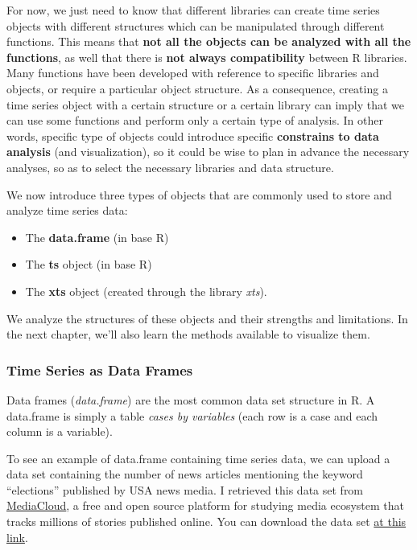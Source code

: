 \documentclass[
]{article}
\providecommand{\tightlist}{%
  \setlength{\itemsep}{0pt}\setlength{\parskip}{0pt}}
\begin{document}
For now, we just need to know that different libraries can create time series objects with different structures which can be manipulated through different functions. This means that \textbf{not all the objects can be analyzed with all the functions}, as well that there is \textbf{not always compatibility} between R libraries.
Many functions have been developed with reference to specific libraries and objects, or require a particular object structure. As a consequence, creating a time series object with a certain structure or a certain library can imply that we can use some functions and perform only a certain type of analysis. In other words, specific type of objects could introduce specific \textbf{constrains to data analysis} (and visualization), so it could be wise to plan in advance the necessary analyses, so as to select the necessary libraries and data structure.

We now introduce three types of objects that are commonly used to store and analyze time series data:

\begin{itemize}
\tightlist
\item
  The \textbf{data.frame} (in base R)
\item
  The \textbf{ts} object (in base R)
\item
  The \textbf{xts} object (created through the library \emph{xts}).
\end{itemize}

We analyze the structures of these objects and their strengths and limitations. In the next chapter, we'll also learn the methods available to visualize them.

\hypertarget{time-series-as-data-frames}{%
\subsubsection{Time Series as Data Frames}\label{time-series-as-data-frames}}

Data frames (\emph{data.frame}) are the most common data set structure in R. A data.frame is simply a table \emph{cases by variables} (each row is a case and each column is a variable).

To see an example of data.frame containing time series data, we can upload a data set containing the number of news articles mentioning the keyword ``elections'' published by USA news media. I retrieved this data set from \href{https://mediacloud.org}{MediaCloud}, a free and open source platform for studying media ecosystem that tracks millions of stories published online. You can download the data set \href{https://drive.google.com/file/d/1vzpdPFb_ihBlqqbHxJS7mEvzQ3tNhmEm/view?usp=sharing}{at this link}.
\end{document}
